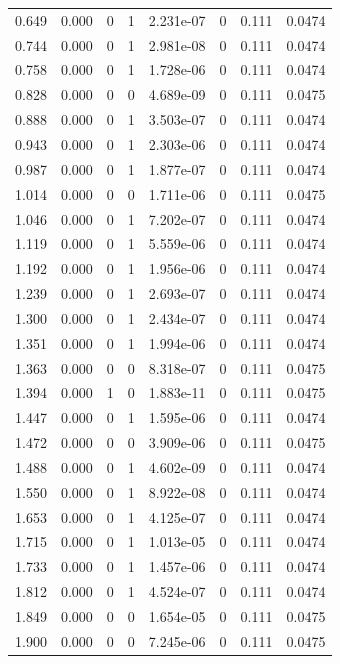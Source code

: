 \documentclass[preview]{standalone}
\begin{document}
{{\begin{tabular}{L{1.2cm}C{1.2cm} C{0.3cm}C{0.5cm} C{1.4cm}C{1.4cm} C{1.4cm}C{1.4cm}}
  0.649  &  0.000  & 0     &  1 &  2.231e-07  & 0  & 0.111 &  0.0474   \\ 
  0.744  &  0.000  & 0     &  1 &  2.981e-08  & 0  & 0.111 &  0.0474   \\ 
  0.758  &  0.000  & 0     &  1 &  1.728e-06  & 0  & 0.111 &  0.0474   \\ 
  0.828  &  0.000  & 0     &  0 &  4.689e-09  & 0  & 0.111 &  0.0475   \\ 
  0.888  &  0.000  & 0     &  1 &  3.503e-07  & 0  & 0.111 &  0.0474   \\ 
  0.943  &  0.000  & 0     &  1 &  2.303e-06  & 0  & 0.111 &  0.0474   \\ 
  0.987  &  0.000  & 0     &  1 &  1.877e-07  & 0  & 0.111 &  0.0474   \\ 
  1.014  &  0.000  & 0     &  0 &  1.711e-06  & 0  & 0.111 &  0.0475   \\ 
  1.046  &  0.000  & 0     &  1 &  7.202e-07  & 0  & 0.111 &  0.0474   \\ 
  1.119  &  0.000  & 0     &  1 &  5.559e-06  & 0  & 0.111 &  0.0474   \\ 
  1.192  &  0.000  & 0     &  1 &  1.956e-06  & 0  & 0.111 &  0.0474   \\ 
  1.239  &  0.000  & 0     &  1 &  2.693e-07  & 0  & 0.111 &  0.0474   \\ 
  1.300  &  0.000  & 0     &  1 &  2.434e-07  & 0  & 0.111 &  0.0474   \\ 
  1.351  &  0.000  & 0     &  1 &  1.994e-06  & 0  & 0.111 &  0.0474   \\ 
  1.363  &  0.000  & 0     &  0 &  8.318e-07  & 0  & 0.111 &  0.0475   \\ 
  1.394  &  0.000  & 1     &  0 &  1.883e-11  & 0  & 0.111 &  0.0475   \\ 
  1.447  &  0.000  & 0     &  1 &  1.595e-06  & 0  & 0.111 &  0.0474   \\ 
  1.472  &  0.000  & 0     &  0 &  3.909e-06  & 0  & 0.111 &  0.0475   \\ 
  1.488  &  0.000  & 0     &  1 &  4.602e-09  & 0  & 0.111 &  0.0474   \\ 
  1.550  &  0.000  & 0     &  1 &  8.922e-08  & 0  & 0.111 &  0.0474   \\ 
  1.653  &  0.000  & 0     &  1 &  4.125e-07  & 0  & 0.111 &  0.0474   \\ 
  1.715  &  0.000  & 0     &  1 &  1.013e-05  & 0  & 0.111 &  0.0474   \\ 
  1.733  &  0.000  & 0     &  1 &  1.457e-06  & 0  & 0.111 &  0.0474   \\ 
  1.812  &  0.000  & 0     &  1 &  4.524e-07  & 0  & 0.111 &  0.0474   \\ 
  1.849  &  0.000  & 0     &  0 &  1.654e-05  & 0  & 0.111 &  0.0475   \\ 
  1.900  &  0.000  & 0     &  0 &  7.245e-06  & 0  & 0.111 &  0.0475   \\ 
\hline 
\end{tabular} 

}}
\end{document}
